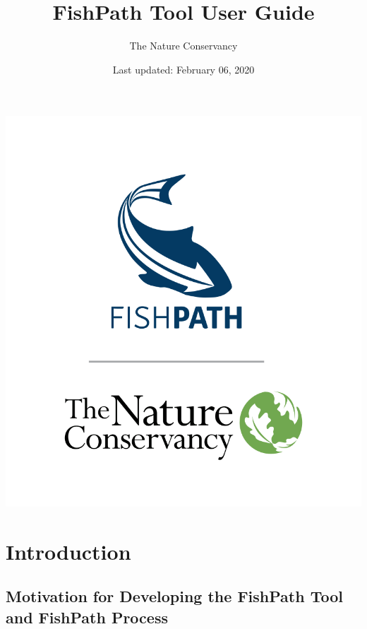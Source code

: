 \documentclass[11pt,]{book}
\title{FishPath Tool User Guide}
\author{The Nature Conservancy}
\date{Last updated: February 06, 2020}
\begin{document}
\maketitle

{
\setcounter{tocdepth}{1}
\tableofcontents
}
\hypertarget{section}{%
\chapter*{}\label{section}}

\begin{center}\includegraphics[width=0.4\linewidth]{images/fishpath-tnc-vertical} \end{center}

\hypertarget{intro}{%
\chapter{Introduction}\label{intro}}

\hypertarget{motivation}{%
\section{Motivation for Developing the FishPath Tool and FishPath Process}\label{motivation}}
\end{document}
